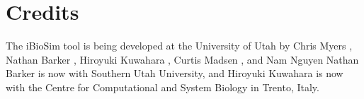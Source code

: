 \documentclass[titlepage,11pt]{article}
\begin{document}
\section{Credits}

\noindent
The iBioSim tool is being developed at the University of Utah
by 
Chris Myers
,
Nathan Barker
,
Hiroyuki Kuwahara
,
Curtis Madsen
, and
Nam Nguyen
Nathan Barker is now with Southern Utah University, and Hiroyuki
Kuwahara is now with the Centre for Computational and System
Biology in Trento, Italy. 
  
\end{document}
